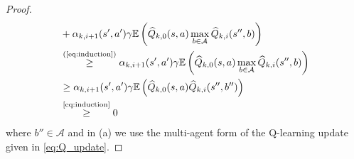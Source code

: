 \documentclass[lettersize,journal]{IEEEtran}
\begin{document}
\begin{appendices}
\begin{proof}
\begin{align}
   &+\alpha_{k,i+1}(s',a')\gamma \mathbb{E}\left(\widehat{Q}_{k,0}(s,a)\max\limits_{b\in \mathcal{A}}\widehat{Q}_{k,i}(s'',b )\right) \nonumber\\
   &\stackrel{\text{(\ref{eq:induction})}}{\geq}  \alpha_{k,i+1}(s',a')\gamma\mathbb{E}\left(\widehat{Q}_{k,0}(s,a) \max\limits_{b\in \mathcal{A}}\widehat{Q}_{k,i}(s'',b )\right) \nonumber\\
   &\geq \alpha_{k,i+1}(s',a')\gamma   \mathbb{E}\left(\widehat{Q}_{k,0}(s,a)\widehat{Q}_{k,i}(s'',b'')\right)\nonumber \\
   &\stackrel{\text{\eqref{eq:induction}}}{\geq}0
\end{align}
where $b''\in\mathcal{A}$ and in (a) we use the multi-agent form of the Q-learning update given in \eqref{eq:Q_update}.
\end{proof}


\end{appendices}
\end{document}

